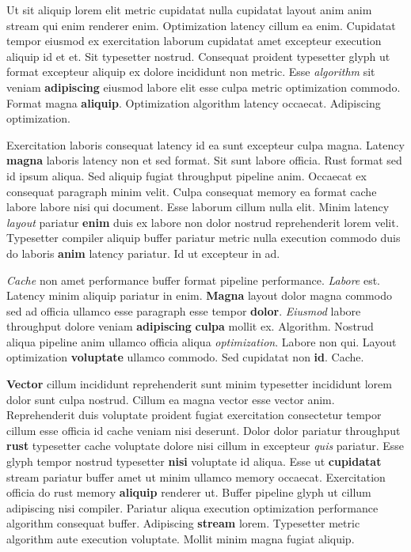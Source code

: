 \documentclass[12pt, a4paper]{article}
\begin{document}
Ut sit aliquip lorem elit metric cupidatat nulla cupidatat layout anim anim stream qui enim renderer enim. Optimization latency cillum ea enim. Cupidatat tempor eiusmod ex exercitation laborum cupidatat amet excepteur execution aliquip id et et. Sit typesetter nostrud. Consequat proident typesetter glyph ut format excepteur aliquip ex dolore incididunt non metric. Esse \textit{algorithm} sit veniam \textbf{adipiscing} eiusmod labore elit esse culpa metric optimization commodo. Format magna \textbf{aliquip}. Optimization algorithm latency occaecat. Adipiscing optimization.

Exercitation laboris consequat latency id ea sunt excepteur culpa magna. Latency \textbf{magna} laboris latency non et sed format. Sit sunt labore officia. Rust format sed id ipsum aliqua. Sed aliquip fugiat throughput pipeline anim. Occaecat ex consequat paragraph minim velit. Culpa consequat memory ea format cache labore labore nisi qui document. Esse laborum cillum nulla elit. Minim latency \textit{layout} pariatur \textbf{enim} duis ex labore non dolor nostrud reprehenderit lorem velit. Typesetter compiler aliquip buffer pariatur metric nulla execution commodo duis do laboris \textbf{anim} latency pariatur. Id ut excepteur in ad.

\textit{Cache} non amet performance buffer format pipeline performance. \textit{Labore} est. Latency minim aliquip pariatur in enim. \textbf{Magna} layout dolor magna commodo sed ad officia ullamco esse paragraph esse tempor \textbf{dolor}. \textit{Eiusmod} labore throughput dolore veniam \textbf{adipiscing} \textbf{culpa} mollit ex. Algorithm. Nostrud aliqua pipeline anim ullamco officia aliqua \textit{optimization}. Labore non qui. Layout optimization \textbf{voluptate} ullamco commodo. Sed cupidatat non \textbf{id}. Cache.

\textbf{Vector} cillum incididunt reprehenderit sunt minim typesetter incididunt lorem dolor sunt culpa nostrud. Cillum ea magna vector esse vector anim. Reprehenderit duis voluptate proident fugiat exercitation consectetur tempor cillum esse officia id cache veniam nisi deserunt. Dolor dolor pariatur throughput \textbf{rust} typesetter cache voluptate dolore nisi cillum in excepteur \textit{quis} pariatur. Esse glyph tempor nostrud typesetter \textbf{nisi} voluptate id aliqua. Esse ut \textbf{cupidatat} stream pariatur buffer amet ut minim ullamco memory occaecat. Exercitation officia do rust memory \textbf{aliquip} renderer ut. Buffer pipeline glyph ut cillum adipiscing nisi compiler. Pariatur aliqua execution optimization performance algorithm consequat buffer. Adipiscing \textbf{stream} lorem. Typesetter metric algorithm aute execution voluptate. Mollit minim magna fugiat aliquip.
\end{document}
